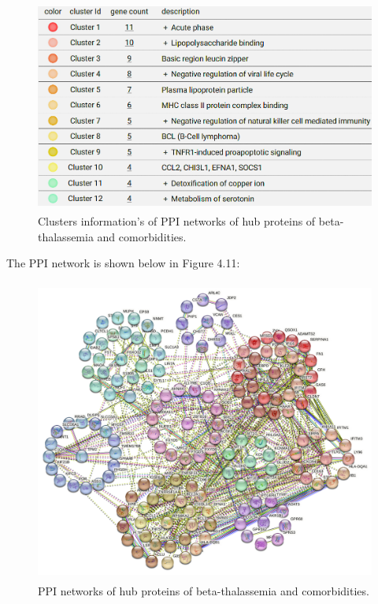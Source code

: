 \begin{figure}[H]
    \centering
    \includegraphics[height=7cm]{./fig/fig4_10.png}
    \centering
    \caption{Clusters information's of PPI networks of hub proteins of beta-thalassemia and comorbidities.}
    \label{PPI networks of hub proteins}
\end{figure}


The PPI network is shown below in Figure 4.11:

\begin{figure}[H]
    \centering
    \includegraphics[height=10cm]{./fig/fig4_11.png}
    \centering
    \caption{PPI networks of hub proteins of beta-thalassemia and comorbidities.}
    \label{PPI networks of hub proteins of beta-thalassemia and comorbidities.}
\end{figure}

